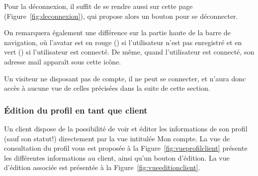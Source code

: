 Pour la déconnexion, il suffit de se rendre aussi sur cette page (Figure~\ref{fig:deconnexion}), qui propose alors un bouton pour se déconnecter.

On remarquera également une différence sur la partie haute de la barre de navigation, où l'avatar \faUser{} est en rouge (\thColor{\faUser}) si l'utilisateur n'est pas enregistré et en vert (\textcolor{vertforet}{\faUser}) si l'utilisateur est connecté. De même, quand l'utilisateur est connecté, son adresse mail apparaît sous cette icône.

Un visiteur ne disposant pas de compte, il ne peut se connecter, et n'aura donc accès à aucune vue de celles précisées dans la suite de cette section.

\subsubsection{\'Edition du profil en tant que client}
Un client dispose de la possibilité de voir et éditer les informations de son profil (sauf son statut!) directement par la vue intitulée \og Mon compte\fg. La vue de consultation du profil vous est proposée à la Figure~\ref{fig:vueprofilclient} présente les différentes informations au client, ainsi qu'un bouton d'édition. La vue d'édition associée est présentée à la Figure~\ref{fig:vueeditionclient}.

